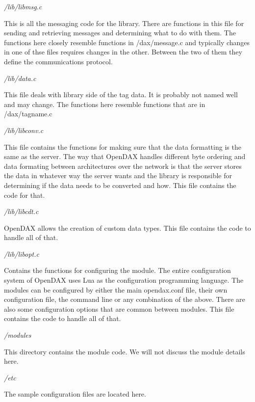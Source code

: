 \emph{/lib/libmsg.c}

This is all the messaging code for the library. There are functions in this file for sending and retrieving messages and determining what to do with them. The functions here closely resemble functions in /dax/message.c and typically changes in one of thse files requires changes in the other. Between the two of them they define the
communications protocol.

\emph{/lib/data.c}

This file deals with library side of the tag data. It is probably not named well and may change. The functions here resemble functions that are in /dax/tagname.c

\emph{/lib/libconv.c}

This file contains the functions for making sure that the data formatting is the same as the server. The way that OpenDAX handles different byte ordering and data formating between architectures over the network is that the server stores the data in whatever way the server wants and the library is responsible for determining if the data needs to be converted and how. This file contains the code for that.

\emph{/lib/libcdt.c}

OpenDAX allows the creation of custom data types. This file contains the code to handle all of that.

\emph{/lib/libopt.c}

Contains the functions for configuring the module. The entire configuration system of OpenDAX uses Lua as the configuration programming language. The modules can be configured by either the main opendax.conf file, their own configuration file, the command line or any combination of the above. There are also some configuration options that are common between modules. This file contains the code to handle all of that.

\emph{/modules}

This directory contains the module code. We will not discuss the module details here.

\emph{/etc}

The sample configuration files are located here.
